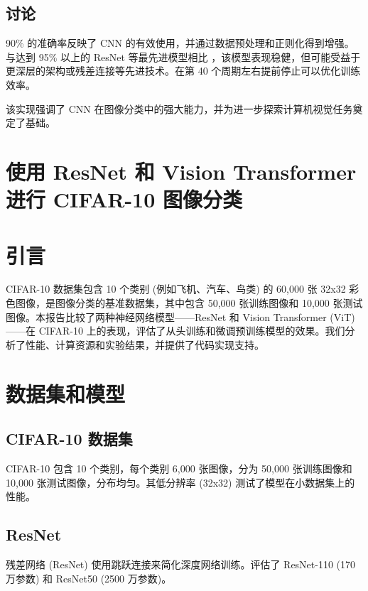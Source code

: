 \documentclass[UTF8]{report}
\theoremstyle{MyLineTheoremStyle} %
\theoremstyle{MyBlockTheoremStyle} %
\theoremstyle{MySubsubsectionStyle} %
\begin{document}

\subsection{讨论}

90\% 的准确率反映了 CNN 的有效使用，并通过数据预处理和正则化得到增强。与达到 95\% 以上的 ResNet 等最先进模型相比 \cite{resnet}，该模型表现稳健，但可能受益于更深层的架构或残差连接等先进技术。在第 40 个周期左右提前停止可以优化训练效率。

该实现强调了 CNN 在图像分类中的强大能力，并为进一步探索计算机视觉任务奠定了基础。

\cleardoublepage

\section{使用 ResNet 和 Vision Transformer 进行 CIFAR-10 图像分类}

\section*{引言}
CIFAR-10 数据集包含 10 个类别 (例如飞机、汽车、鸟类) 的 60,000 张 32x32 彩色图像，是图像分类的基准数据集，其中包含 50,000 张训练图像和 10,000 张测试图像。本报告比较了两种神经网络模型——ResNet 和 Vision Transformer (ViT)——在 CIFAR-10 上的表现，评估了从头训练和微调预训练模型的效果。我们分析了性能、计算资源和实验结果，并提供了代码实现支持。

\section*{数据集和模型}
\subsection*{CIFAR-10 数据集}
CIFAR-10 包含 10 个类别，每个类别 6,000 张图像，分为 50,000 张训练图像和 10,000 张测试图像，分布均匀。其低分辨率 (32x32) 测试了模型在小数据集上的性能。

\subsection*{ResNet}
残差网络 (ResNet) 使用跳跃连接来简化深度网络训练。评估了 ResNet-110 (170 万参数) 和 ResNet50 (2500 万参数)。
\end{document}
